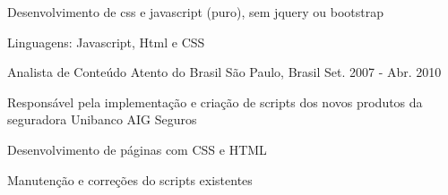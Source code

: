 \begin{cventries}
{\begin{cvitems}
         \item {Desenvolvimento de css e javascript (puro), sem jquery ou bootstrap}
         \item {Linguagens: Javascript, Html e CSS}
      \end{cvitems}
    }
  \cventry
    {Analista de Conteúdo}
    {Atento do Brasil}
    {São Paulo, Brasil}
    {Set. 2007 - Abr. 2010}
    {
      \begin{cvitems}
         \item {Responsável pela implementação e criação de scripts dos novos produtos da seguradora Unibanco AIG Seguros}
         \item {Desenvolvimento de páginas com CSS e HTML}
         \item {Manutenção e correções do scripts existentes}
      \end{cvitems}
    }
\end{cventries}
